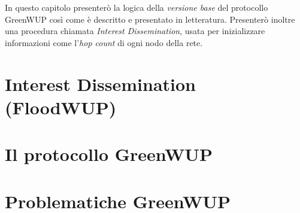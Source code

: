 In questo capitolo presenterò la logica della \textit{versione base} del protocollo GreenWUP così come è descritto e presentato in letteratura. Presenterò inoltre una procedura chiamata \textit{Interest Dissemination}, usata per inizializzare informazioni come l'\textit{hop count} di ogni nodo della rete.  

\section{Interest Dissemination (FloodWUP)}


\section{Il protocollo GreenWUP}


\newpage

\section{Problematiche GreenWUP}
